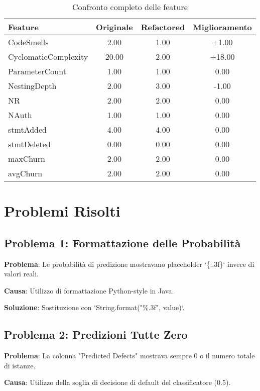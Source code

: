 \documentclass[12pt,a4paper]{article}
\begin{document}
\begin{table}[H]
\centering
\begin{tabular}{@{}lccc@{}}
\toprule
\textbf{Feature} & \textbf{Originale} & \textbf{Refactored} & \textbf{Miglioramento} \\
\midrule
CodeSmells & 2.00 & 1.00 & +1.00 \\
CyclomaticComplexity & 20.00 & 2.00 & +18.00 \\
ParameterCount & 1.00 & 1.00 & 0.00 \\
NestingDepth & 2.00 & 3.00 & -1.00 \\
NR & 2.00 & 2.00 & 0.00 \\
NAuth & 1.00 & 1.00 & 0.00 \\
stmtAdded & 4.00 & 4.00 & 0.00 \\
stmtDeleted & 0.00 & 0.00 & 0.00 \\
maxChurn & 2.00 & 2.00 & 0.00 \\
avgChurn & 2.00 & 2.00 & 0.00 \\
\bottomrule
\end{tabular}
\caption{Confronto completo delle feature}
\end{table}

\section{Problemi Risolti}

\subsection{Problema 1: Formattazione delle Probabilità}

\textbf{Problema}: Le probabilità di predizione mostravano placeholder `\{:.3f\}` invece di valori reali.

\textbf{Causa}: Utilizzo di formattazione Python-style in Java.

\textbf{Soluzione}: Sostituzione con `String.format("\%.3f", value)`.

\subsection{Problema 2: Predizioni Tutte Zero}

\textbf{Problema}: La colonna "Predicted Defects" mostrava sempre 0 o il numero totale di istanze.

\textbf{Causa}: Utilizzo della soglia di decisione di default del classificatore (0.5).
\end{document}
